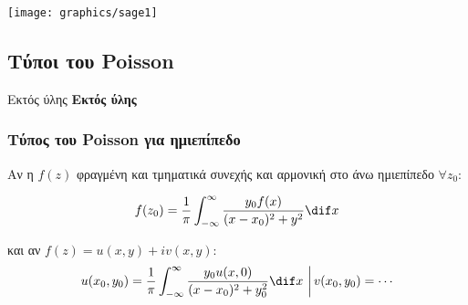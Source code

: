 \documentclass[12pt,a4paper,notitlepage,fleqn]{article}
\begin{document}
    \begin{center}
    \texttt{[image: graphics/sage1]}
    \end{center}
    
    \subsection{Τύποι του Poisson}
    \begin{attnbox}{Εκτός ύλης}
    	\textbf{\large Εκτός ύλης}
    \end{attnbox}
    
    \subsubsection{Τύπος του Poisson για ημιεπίπεδο}
    
    Αν η \( f(z) \) φραγμένη και τμηματικά συνεχής και αρμονική στο άνω ημιεπίπεδο
    \( \forall z_0 \):
    
    \[
    f(z_0) = \frac{1}{\pi} \int_{-\infty}^{\infty}
    \frac{y_0f(x)}{(x-x_0)^2+y^2} \dif x
    \]
    
    και αν \( f(z) = u(x,y) + iv(x,y) \):
    \[
    \left.
    u(x_0,y_0) = \frac{1}{\pi} \int_{-\infty}^{\infty}
    \frac{y_0u(x,0)}{(x-x_0)^2 + y_0^2}\dif x 
    \ \right|
    v(x_0,y_0) = \cdots
    \]
    
    
\end{document}
